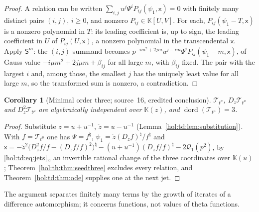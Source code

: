 \documentclass[11pt]{article}
\numberwithin{equation}{section}
\newtheorem{corollary}[theorem]{Corollary}
\theoremstyle{definition}
\theoremstyle{remark}
\newcommand{\KK}{\mathbb K}
\begin{document}
\begin{proof}
A relation can be written $\sum_{i,j}u^j\Psi^iP_{ij}(\psi_1,\mathsf x)=0$ with
finitely many distinct pairs $(i,j)$, $i\ge0$, and nonzero
$P_{ij}\in\KK[U,V]$. For each, $P_{ij}(\psi_1-T,\mathsf x)$ is a nonzero
polynomial in $T$: its leading coefficient is, up to sign, the leading
coefficient in $U$ of $P_{ij}(U,\mathsf x)$, a nonzero polynomial in the
transcendental $\mathsf x$. Apply $\mathsf S^m$: the $(i,j)$ summand becomes
$p^{-im^2+2jm}u^{j-im}\Psi^iP_{ij}(\psi_1-m,\mathsf x)$, of Gauss value
$-i\mu m^2+2j\mu m+\beta_{ij}$ for all large $m$, with $\beta_{ij}$ fixed. The
pair with the largest $i$ and, among those, the smallest $j$ has the uniquely
least value for all large $m$, so the transformed sum is nonzero, a
contradiction.
\end{proof}

\begin{corollary}[Minimal order three; source~16, credited conclusion]
\label{hol:th:cor:seedminimal}
$\mathcal T_{t^\mu}$, $D_z\mathcal T_{t^\mu}$ and $D_z^2\mathcal T_{t^\mu}$ are
algebraically independent over $\KK(z)$, and
$\operatorname{dord}(\mathcal T_{t^\mu})=3$.
\end{corollary}

\begin{proof}
Substitute $z=u+u^{-1}$, $\check z=u-u^{-1}$
(Lemma~\ref{hol:td:lem:substitution}). With $f=\mathcal T_{t^\mu}$ one has
$\Psi=f^\natural$, $\psi_1=\check z(D_zf)^\natural/f^\natural$ and
$\mathsf x=-\check z^2\bigl(D_z^2f/f-(D_zf/f)^2\bigr)^\natural-(u+u^{-1})
(D_zf/f)^\natural-2\mathcal Q_1(p^2)$, by \eqref{hol:td:eq:jets},, an invertible rational change of the three coordinates
over $\KK(u)$; Theorem~\ref{hol:th:thm:seedthree} excludes every relation, and
Theorem~\ref{hol:td:thm:ode} supplies one at the next jet.
\end{proof}

The argument separates finitely many terms by the growth of iterates of a
difference automorphism; it concerns functions, not values of theta
functions.
\end{document}
